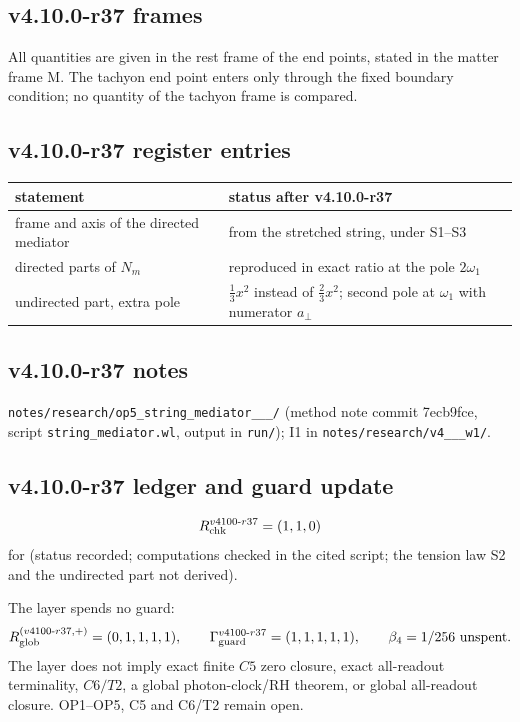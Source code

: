 \subsection*{v4.10.0-r37 frames}
\label{subsec:v4100-r37-frames}

All quantities are given in the rest frame of the end points, stated in the matter frame M.  The tachyon end point enters only through the
fixed boundary condition; no quantity of the tachyon frame is compared.

\subsection*{v4.10.0-r37 register entries}
\label{subsec:v4100-r37-register}

\begin{center}
\small
\begin{tabular}{@{}>{\raggedright\arraybackslash}p{}>{\raggedright\arraybackslash}p{}@{}}
\toprule
statement & status after v4.10.0-r37\\
\midrule
frame and axis of the directed mediator & from the stretched string, under S1--S3\\
directed parts of \(N_m\) & reproduced in exact ratio at the pole \(2\omega_1\)\\
undirected part, extra pole & \(\tfrac13x^2\) instead of \(\tfrac23x^2\); second pole at \(\omega_1\) with numerator \(a_\perp\)\\
\bottomrule
\end{tabular}
\end{center}

\subsection*{v4.10.0-r37 notes}
\label{subsec:v4100-r37-notes}

\texttt{notes/\allowbreak research/\allowbreak op5\_\allowbreak string\_\allowbreak mediator\_\_\_/} (method note commit 7ecb9fce,
script \texttt{string\_\allowbreak mediator.wl}, output in \texttt{run/}); I1 in \texttt{notes/\allowbreak research/\allowbreak v4\_\_\_\allowbreak w1/}.

\subsection*{v4.10.0-r37 ledger and guard update}
\label{subsec:v4100-r37-ledger-guard}

\[
R_{\rm chk}^{v4100\text{-}r37}=(1,1,0)
\]
for (status recorded; computations checked in the cited script; the tension law S2 and the undirected part not derived).

The layer spends no guard:
\[
R_{\rm glob}^{(v4100\text{-}r37,+)}=(0,1,1,1,1),
\qquad
\Gamma_{\rm guard}^{v4100\text{-}r37}=(1,1,1,1,1),
\qquad
\beta_4=1/256\ \text{unspent}.
\]
The layer does not imply exact finite \(C5\) zero closure, exact all-readout terminality, \(C6/T2\), a global photon-clock/RH theorem,
or global all-readout closure.  OP1--OP5, C5 and C6/T2 remain open.

